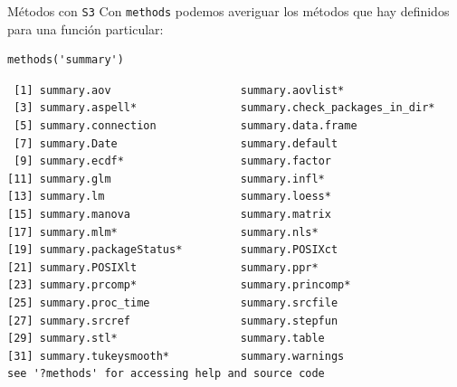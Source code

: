 \documentclass[xcolor={usenames,svgnames,dvipsnames}]{beamer}
\begin{document}
\begin{frame}[label={sec:org07d9120},fragile]{Métodos con \texttt{S3}}
 Con \texttt{methods} podemos averiguar los métodos que hay definidos para una función particular:
\lstset{language=r,label= ,caption= ,captionpos=b,numbers=none}
\begin{lstlisting}
methods('summary')
\end{lstlisting}

\begin{verbatim}
 [1] summary.aov                    summary.aovlist*              
 [3] summary.aspell*                summary.check_packages_in_dir*
 [5] summary.connection             summary.data.frame            
 [7] summary.Date                   summary.default               
 [9] summary.ecdf*                  summary.factor                
[11] summary.glm                    summary.infl*                 
[13] summary.lm                     summary.loess*                
[15] summary.manova                 summary.matrix                
[17] summary.mlm*                   summary.nls*                  
[19] summary.packageStatus*         summary.POSIXct               
[21] summary.POSIXlt                summary.ppr*                  
[23] summary.prcomp*                summary.princomp*             
[25] summary.proc_time              summary.srcfile               
[27] summary.srcref                 summary.stepfun               
[29] summary.stl*                   summary.table                 
[31] summary.tukeysmooth*           summary.warnings              
see '?methods' for accessing help and source code
\end{verbatim}
\end{frame}
\end{document}
